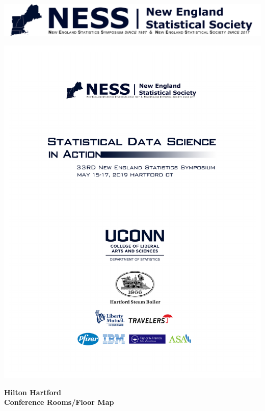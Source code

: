 \documentclass[10pt]{article}
\begin{document}
\clearpage

\includegraphics[width=\textwidth]{ness_banner.pdf}
\vfill

\includegraphics[width=\textwidth, viewport=0.75in 1in 7.75in 8in, clip=true]{ness2019cover.pdf}
\thispagestyle{empty}

\clearpage

\begin{center}
  {\bf\Huge Hilton Hartford\\[4pt] Conference Rooms/Floor Map}
\end{center} 
\bigskip
{}
\end{document}
